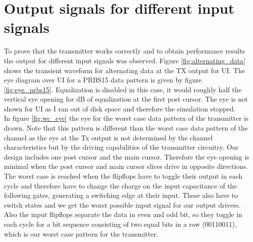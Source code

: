 \section{Output signals for different input signals}

To prove that the transmitter works correctly and to obtain performance results the output for different input signals was observed. Figure \ref{fig:alternating_data} shows the transient waveform for alternating data at the TX output for \unit[6]{UI}. The eye diagram over \unit[2940]{UI} for a PRBS15 data pattern is given by figure \ref{fig:eye_prbs15}. Equalization is disabled in this case, it would roughly half the vertical eye opening for \unit[6]{dB} of equalization at the first post cursor. The eye is not shown for \unit[10000]{UI} as I ran out of disk space and therefore the simulation stopped.\\
In figure \ref{fig:wc_eye} the eye for the worst case data pattern of the transmitter is drawn. Note that this pattern is different than the worst case data pattern of the channel as the eye at the Tx output is not determined by the channel characteristics but by the driving capabilities of the transmitter circuitry. Our design includes one post cursor and the main cursor. Therefore the eye opening is minimal when the post cursor and main cursor slices drive in opposite directions. The worst case is reached when the flipflops have to toggle their output in each cycle and therefore have to change the charge on the input capacitance of the following gates, generating a switching edge at their input. These also have to switch states and we get the worst possible input signal for our output drivers. Also the input flipflops separate the data in even and odd bit, so they toggle in each cycle for a bit sequence consisting of two equal bits in a row (00110011), which is our worst case pattern for the transmitter.


